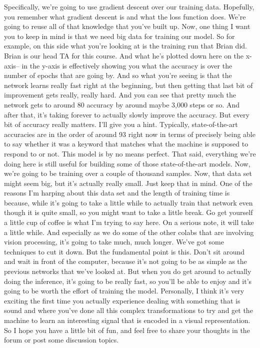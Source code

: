 Specifically, we're going to use gradient descent over our training
data.
Hopefully, you remember what gradient descent is
and what the loss function does.
We're going to reuse all of that knowledge that you've built up.
Now, one thing I want you to keep in mind
is that we need big data for training our model.
So for example, on this side what you're looking at
is the training run that Brian did.
Brian is our head TA for this course.
And what he's plotted down here on the x-axis--
in the y-axis is effectively showing you what
the accuracy is over the number of epochs that are going by.
And so what you're seeing is that the network learns really fast right
at the beginning, but then getting that last bit of improvement
gets really, really hard.
And you can see that pretty much the network gets to around 80%
accuracy by around maybe 3,000 steps or so.
And after that, it's taking forever to actually slowly improve the accuracy.
But every bit of accuracy really matters.
I'll give you a hint.
Typically, state-of-the-art accuracies are in the order of around 93%
right now in terms of precisely being able to say whether it was a keyword
that matches what the machine is supposed to respond to or not.
This model is by no means perfect.
That said, everything we're doing here is still useful for building some
of those state-of-the-art models.
Now, we're going to be training over a couple of thousand samples.
Now, that data set might seem big, but it's actually really small.
Just keep that in mind.
One of the reasons I'm harping about this data
set and the length of training time is because,
while it's going to take a little while to actually train that network even
though it is quite small, so you might want to take a little break.
Go get yourself a little cup of coffee is what I'm trying to say here.
On a serious note, it will take a little while.
And especially as we do some of the other colabs that
are involving vision processing, it's going to take much, much longer.
We've got some techniques to cut it down.
But the fundamental point is this.
Don't sit around and wait in front of the computer,
because it's not going to be as simple as the previous networks
that we've looked at.
But when you do get around to actually doing the inference,
it's going to be really fast, so you'll be able to enjoy
and it's going to be worth the effort of training the model.
Personally, I think it's very exciting the first time you actually
experience dealing with something that is sound
and where you've done all this complex transformations to try and get
the machine to learn an interesting signal that
is encoded in a visual representation.
So I hope you have a little bit of fun, and feel
free to share your thoughts in the forum or post some discussion topics.

